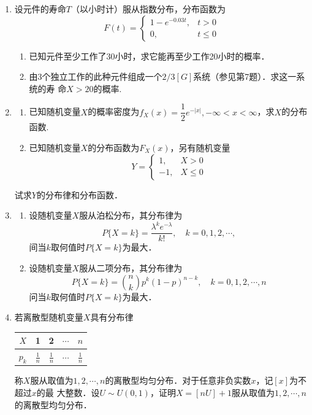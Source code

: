 \documentclass[10pt,a4paper]{article}
\begin{document}
\begin{enumerate}
    \item 设元件的寿命$T$（以小时计）服从指数分布，分布函数为
    $$F(t)=\left\{\begin{array}{ll}
        1-e^{-0.03t}, & t>0\\
        0, & t\leq 0
    \end{array}\right.$$
    \begin{enumerate}
        \item 已知元件至少工作了30小时，求它能再至少工作20小时的概率．
        \item 由3个独立工作的此种元件组成一个$2/3[G]$系统（参见第7题）．求这一系统的寿
        命$X>20$的概率.
    \end{enumerate}
    \clearpage


    \item \begin{enumerate}
        \item 已知随机变量$X$的概率密度为$f_X(x)=\dfrac{1}{2}e^{-|x|},-\infty< x<\infty$，求$X$的分布函数.
        \item 已知随机变量$X$的分布函数为$F_X(x)$，另有随机变量
        $$Y=\left\{\begin{array}{ll}
            1, & X>0\\
            -1, & X\leq 0
        \end{array}\right.$$
    \end{enumerate}
    试求$Y$的分布律和分布函数．
    \clearpage



    \item \begin{enumerate}
        \item 设随机变量$X$服从泊松分布，其分布律为
        $$P\{X=k\}=\frac{\lambda^ke^{-\lambda}}{k!},\quad k=0,1,2,\cdots,$$
        间当$k$取何值时$P\{X=k\}$为最大．
        \item 设随机变量$X$服从二项分布，其分布律为
        $$P\{X=k\}=\binom{n}{k}p^k(1-p)^{n-k},\quad k=0,1,2,\cdots,n$$
        问当$k$取何值时$P\{X=k\}$为最大．
    \end{enumerate}
    \clearpage

    
    \item 若离散型随机变量$X$具有分布律
    \renewcommand{\arraystretch}{1.8}
    \begin{table}[H]\centering
        \begin{tabular}{c|cccc}

        $X$   & 1 & 2   & $\cdots$ & $n$   \\ \hline
        $p_k$ & $\displaystyle{\frac{1}{n}}$  & $\displaystyle{\frac{1}{n}}$ & $\cdots$ & $\displaystyle{\frac{1}{n}}$
        \end{tabular}
    \end{table}
        \vspace{-0.5cm}
        称$X$服从取值为$1,2,\cdots,n$的离散型均匀分布．对于任意非负实数$x$，记$[x]$为不超过$x$的最
        大整数．设$U\sim U(0,1)$，证明$X= [nU]+1$服从取值为$1,2,\cdots,n$的离散型均匀分布．
    \renewcommand{\arraystretch}{1}
    \clearpage




\end{enumerate}
\end{document}
